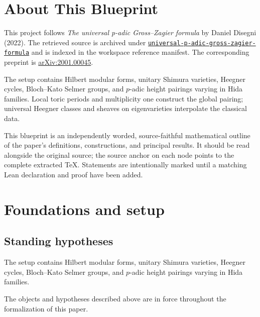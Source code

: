 

\chapter*{About This Blueprint}
\label{universal-p-adic-gross-zagier-formula-about}

This project follows \emph{The universal p-adic Gross--Zagier formula} by Daniel Disegni (2022). The
retrieved source is archived under
\href{../../../../../references/universal-p-adic-gross-zagier-formula/}{\texttt{universal-p-adic-gross-zagier-formula}} and is indexed in
the workspace reference manifest. The corresponding preprint is
\href{https://arxiv.org/abs/2001.00045}{arXiv:2001.00045}.

The setup contains Hilbert modular forms, unitary Shimura varieties, Heegner cycles, Bloch--Kato Selmer groups, and $p$-adic height pairings varying in Hida families. Local toric periods and multiplicity one construct the global pairing; universal Heegner classes and sheaves on eigenvarieties interpolate the classical data.

This blueprint is an independently worded, source-faithful mathematical
outline of the paper's definitions, constructions, and principal results. It
should be read alongside the original source; the source anchor on each node
points to the complete extracted TeX. Statements are intentionally marked
\notready until a matching Lean declaration and proof have been added.

\chapter{Foundations and setup}
\label{chap:universal-p-adic-gross-zagier-formula-foundations}

\section{Standing hypotheses}
\label{sec:universal-p-adic-gross-zagier-formula-standing}

The setup contains Hilbert modular forms, unitary Shimura varieties, Heegner cycles, Bloch--Kato Selmer groups, and $p$-adic height pairings varying in Hida families.

\begin{convention}
\label{universal-p-adic-gross-zagier-formula-setup}
The objects and hypotheses described above are in force throughout the
formalization of this paper.
\notready
\end{convention}

